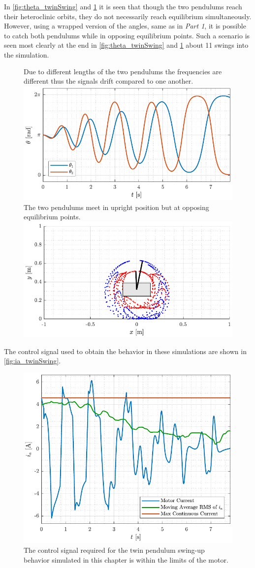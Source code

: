 %
%
In \autoref{fig:theta_twinSwing} and \ref{fig:ani_twinSwing} it is seen that though the two pendulums reach their heteroclinic orbits, they do not necessarily reach equilibrium simultaneously. However, using a wrapped version of the angles, same as in \textit{Part 1}, it is possible to catch both pendulums while in opposing equilibrium points. Such a scenario is seen most clearly at the end in \autoref{fig:theta_twinSwing} and \ref{fig:ani_twinSwing} about 11 swings into the simulation.
\begin{figure}[H]
  \hspace{-10pt}
  \captionbox 
  {
    Due to different lengths of the two pendulums the frequencies are different thus the signals drift compared to one another.
    \label{fig:theta_twinSwing}
  }
  {
    \hspace{-1cm}
    \includegraphics[width=.46\textwidth]{figures/theta_twinSwing}
  }
  \hspace{20pt}
  \captionbox 
  {
    The two pendulums meet in upright position but at opposing equilibrium points.
    \label{fig:ani_twinSwing}
  }
  {
    \hspace{-1cm}
    \includegraphics[width=.46\textwidth]{figures/ani_twinSwing}
  }
\end{figure}
%
The control signal used to obtain the behavior in these simulations are shown in \autoref{fig:ia_twinSwing}.
%
\begin{figure}[H]
  \includegraphics[width=.5\textwidth]{figures/ia_twinSwing}
  \caption{The control signal required for the twin pendulum swing-up behavior simulated in this chapter is within the limits of the motor.}
  \label{fig:ia_twinSwing}
\end{figure}
